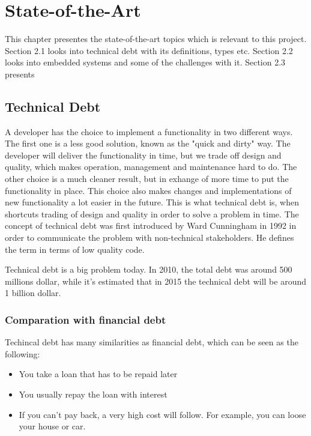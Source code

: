 \chapter{State-of-the-Art}

This chapter presentes the state-of-the-art topics which is relevant to this project. Section 2.1 looks into technical debt with its definitions, types etc. Section 2.2 looks into embedded systems and some of the challenges with it. Section 2.3 presents 


\section{Technical Debt}


A developer has the choice to implement a functionality in two different ways. The first one is a less good solution, known as the "quick and dirty" way\cite{p29-cunningham}. The developer will deliver the functionality in time, but we trade off design and quality, which makes operation, management and maintenance hard to do. The other choice is a much cleaner result, but in exhange of more time to put the functionality in place. This choice also makes changes and implementations of new functionality a lot easier in the future\cite{url-fowler}. This is what technical debt is, when shortcuts trading of design and quality in order to solve a problem in time. The concept of technical debt was first introduced by Ward Cunningham in 1992 in order to communicate the problem with non-technical stakeholders\cite{p29-cunningham}. He defines the term in terms of low quality code. 

Technical debt is a big problem today. In 2010, the total debt was around 500 millions dollar, while it's estimated that in 2015 the technical debt will be around 1 billion dollar\cite{gartner2010}.


\subsection{Comparation with financial debt}
Techincal debt has many similarities as financial debt, which can be seen as the following:
\begin{itemize}
	\item You take a loan that has to be repaid later
	\item You usually repay the loan with interest
	\item If you can't pay back, a very high cost will follow. For example, you can loose your house or car.
\end{itemize}

